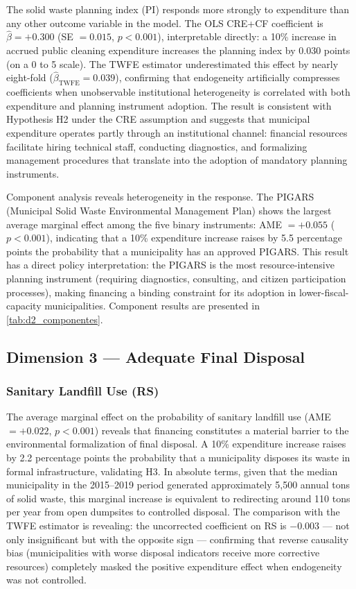 The solid waste planning index (PI) responds more strongly to expenditure than any other outcome variable in the model. The OLS CRE+CF coefficient is $\hat{\beta} = +0.300$ (SE $= 0.015$, $p < 0.001$), interpretable directly: a 10\% increase in accrued public cleaning expenditure increases the planning index by 0.030 points (on a 0 to 5 scale). The TWFE estimator underestimated this effect by nearly eight-fold ($\hat{\beta}_{\text{TWFE}} = 0.039$), confirming that endogeneity artificially compresses coefficients when unobservable institutional heterogeneity is correlated with both expenditure and planning instrument adoption. The result is consistent with Hypothesis H2 under the CRE assumption and suggests that municipal expenditure operates partly through an institutional channel: financial resources facilitate hiring technical staff, conducting diagnostics, and formalizing management procedures that translate into the adoption of mandatory planning instruments.

Component analysis reveals heterogeneity in the response. The PIGARS (Municipal Solid Waste Environmental Management Plan) shows the largest average marginal effect among the five binary instruments: AME $= +0.055$ ($p < 0.001$), indicating that a 10\% expenditure increase raises by 5.5 percentage points the probability that a municipality has an approved PIGARS. This result has a direct policy interpretation: the PIGARS is the most resource-intensive planning instrument (requiring diagnostics, consulting, and citizen participation processes), making financing a binding constraint for its adoption in lower-fiscal-capacity municipalities. Component results are presented in \cref{tab:d2_componentes}.

\subsection{Dimension 3 --- Adequate Final Disposal}
\label{sec:d3}

\subsubsection*{Sanitary Landfill Use (RS)}

The average marginal effect on the probability of sanitary landfill use (AME $= +0.022$, $p < 0.001$) reveals that financing constitutes a material barrier to the environmental formalization of final disposal. A 10\% expenditure increase raises by 2.2 percentage points the probability that a municipality disposes its waste in formal infrastructure, validating H3. In absolute terms, given that the median municipality in the 2015--2019 period generated approximately 5,500 annual tons of solid waste, this marginal increase is equivalent to redirecting around 110 tons per year from open dumpsites to controlled disposal. The comparison with the TWFE estimator is revealing: the uncorrected coefficient on RS is $-0.003$ --- not only insignificant but with the opposite sign --- confirming that reverse causality bias (municipalities with worse disposal indicators receive more corrective resources) completely masked the positive expenditure effect when endogeneity was not controlled.

